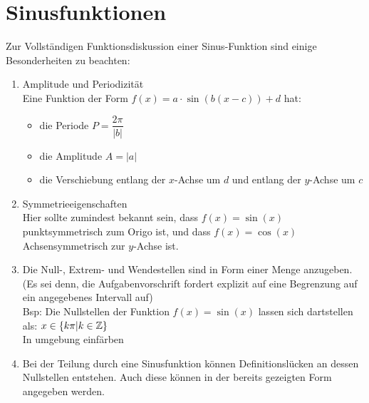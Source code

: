 \section{Sinusfunktionen}
Zur Vollständigen Funktionsdiskussion einer Sinus-Funktion sind einige Besonderheiten zu beachten:
\begin{enumerate}
  \item Amplitude und Periodizität\\
  Eine Funktion der Form $f(x)=a\cdot\sin(b(x-c))+d$ hat:
  \begin{itemize}
    \item die Periode $P = \dfrac{2\pi}{|b|}$
    \item die Amplitude $A = |a|$
    \item die Verschiebung entlang der $x$-Achse um $d$ und entlang der $y$-Achse um $c$
    \end{itemize}
  \item Symmetrieeigenschaften\\
  Hier sollte zumindest bekannt sein, dass $f(x)=\sin(x)$ punktsymmetrisch zum Origo ist, und dass $f(x)=\cos(x)$ Achsensymmetrisch zur $y$-Achse ist.
  \item Die Null-, Extrem- und Wendestellen sind in Form einer Menge anzugeben. (Es sei denn, die Aufgabenvorschrift fordert explizit auf eine Begrenzung auf ein angegebenes Intervall auf)\\
  Bsp: Die Nullstellen der Funktion $f(x)=\sin(x)$ lassen sich dartstellen als: $x \in \{k\pi|k \in \mathbb{Z}\}$
  \\ In umgebung einfärben
  \item Bei der Teilung durch eine Sinusfunktion können Definitionslücken an dessen Nullstellen entstehen. Auch diese können in der bereits gezeigten Form angegeben werden.
  \end{enumerate}
